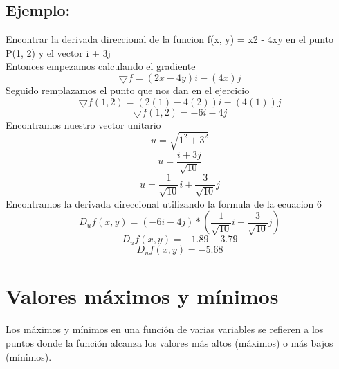 \subsection{Ejemplo:}
Encontrar la derivada direccional de la funcion f(x, y) = x2 - 4xy en el punto P(1, 2) y el vector i + 3j\\
Entonces empezamos calculando el gradiente
\begin{equation}
    \bigtriangledown f = (2x - 4y)i - (4x)j
\end{equation}
Seguido remplazamos el punto que nos dan en el ejercicio
\begin{equation}
    \bigtriangledown f(1, 2) = (2(1) - 4(2))i - (4(1))j
\end{equation}
\begin{equation}
    \bigtriangledown f(1, 2) = -6i - 4j
\end{equation}
Encontramos nuestro vector unitario
\begin{equation}
    u = \sqrt{1^2 + 3^2}
\end{equation}
\begin{equation}
    u = \frac{i + 3j}{\sqrt{10}}
\end{equation}
\begin{equation}
    u = \frac{1}{\sqrt{10}}i + \frac{3}{\sqrt{10}}j
\end{equation}
Encontramos la derivada direccional utilizando la formula de la ecuacion 6
\begin{equation}
    D_uf(x, y) = (-6i - 4j)*(\frac{1}{\sqrt{10}}i + \frac{3}{\sqrt{10}}j)
\end{equation}
\begin{equation}
    D_uf(x, y) = -1.89 - 3.79
\end{equation}
\begin{equation}
    D_uf(x, y) = -5.68
\end{equation}


\section{Valores máximos y mínimos}
    Los máximos y mínimos en una función de varias variables se refieren a los puntos donde la función alcanza los valores más altos (máximos) o más bajos (mínimos). 

